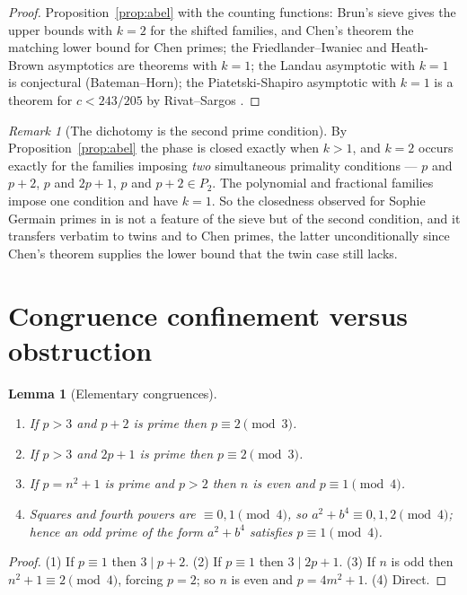 \documentclass[11pt]{amsart}
\numberwithin{equation}{section}
\newtheorem{lemma}[theorem]{Lemma}
\theoremstyle{definition}
\theoremstyle{remark}
\newtheorem{remark}[theorem]{Remark}
\begin{document}
\begin{proof}
Proposition~\ref{prop:abel} with the counting functions: Brun's sieve \cite{HR} gives the upper bounds
with $k=2$ for the shifted families, and Chen's theorem \cite{Chen} the matching lower bound for Chen
primes; the Friedlander--Iwaniec \cite{FI} and Heath-Brown \cite{HB} asymptotics are theorems with $k=1$; the
Landau asymptotic with $k=1$ is conjectural (Bateman--Horn); the Piatetski-Shapiro asymptotic
with $k=1$ is a theorem for $c<243/205$ by Rivat--Sargos \cite{RS}.
\end{proof}

\begin{remark}[The dichotomy is the second prime condition]\label{rem:dichotomy}
By Proposition~\ref{prop:abel} the phase is closed exactly when $k>1$, and $k=2$ occurs
exactly for the families imposing \emph{two} simultaneous primality conditions --- $p$ and
$p+2$, $p$ and $2p+1$, $p$ and $p+2\in P_2$. The polynomial and fractional families impose
one condition and have $k=1$. So the closedness observed for Sophie Germain primes in
\cite[Thm.~5.5]{Main} is not a feature of the sieve but of the second condition, and it
transfers verbatim to twins and to Chen primes, the latter unconditionally since Chen's
theorem supplies the lower bound that the twin case still lacks.
\end{remark}

\section{Congruence confinement versus obstruction}

\begin{lemma}[Elementary congruences]\label{lem:congruence}
\begin{enumerate}
\item If $p>3$ and $p+2$ is prime then $p\equiv2\pmod3$.
\item If $p>3$ and $2p+1$ is prime then $p\equiv2\pmod3$.
\item If $p=n^2+1$ is prime and $p>2$ then $n$ is even and $p\equiv1\pmod4$.
\item Squares and fourth powers are $\equiv0,1\pmod4$, so $a^2+b^4\equiv0,1,2\pmod4$; hence
an odd prime of the form $a^2+b^4$ satisfies $p\equiv1\pmod4$.
\end{enumerate}
\end{lemma}

\begin{proof}
(1) If $p\equiv1$ then $3\mid p+2$. (2) If $p\equiv1$ then $3\mid2p+1$. (3) If $n$ is odd then
$n^2+1\equiv2\pmod4$, forcing $p=2$; so $n$ is even and $p=4m^2+1$. (4) Direct.
\end{proof}
\end{document}
